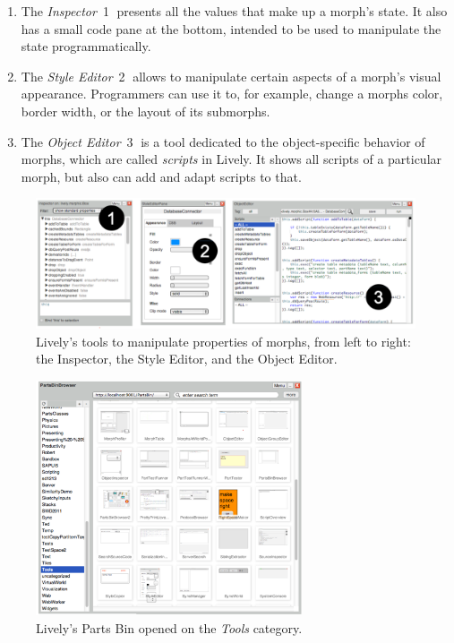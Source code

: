 \begin{enumerate}
    \item The \emph{Inspector}~\textcircled{1} presents all the values that make up a morph's state. It also has a small code pane at the bottom, intended to be used to manipulate the state programmatically.
    \item The \emph{Style Editor}~\textcircled{2} allows to manipulate certain aspects of a morph's visual appearance. Programmers can use it to, for example, change a morphs color, border width, or the layout of its submorphs.
    \item The \emph{Object Editor}~\textcircled{3} is a tool dedicated to the object-specific behavior of morphs, which are called \emph{scripts} in Lively. It shows all scripts of a particular morph, but also can add and adapt scripts to that.
\end{enumerate}

\begin{figure}[h]
    \centering
    \includegraphics[width=\textwidth]{figures/livelyTools.pdf}
    \caption{Lively's tools to manipulate properties of morphs, from left to right: the Inspector, the Style Editor, and the Object Editor.}
    \label{fig:LivelyTools}
\end{figure}

\begin{figure}[h]
    \centering
    \includegraphics[width=0.7\textwidth]{figures/partsBin.pdf}
    \caption{Lively's Parts Bin opened on the \emph{Tools} category.}
    \label{fig:PartsBin}
\end{figure}

